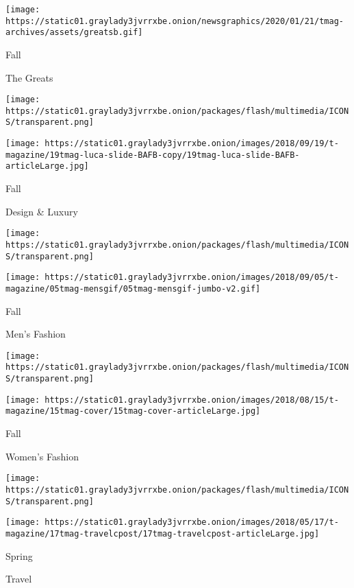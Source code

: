 \texttt{[image: https://static01.graylady3jvrrxbe.onion/newsgraphics/2020/01/21/tmag-archives/assets/greatsb.gif]}

Fall

The Greats

\href{https://www.nytimes3xbfgragh.onion/issue/t-magazine/2018/09/06/ts-sept-23-design-luxury-issue}{}

\texttt{[image: https://static01.graylady3jvrrxbe.onion/packages/flash/multimedia/ICONS/transparent.png]}

\texttt{[image: https://static01.graylady3jvrrxbe.onion/images/2018/09/19/t-magazine/19tmag-luca-slide-BAFB-copy/19tmag-luca-slide-BAFB-articleLarge.jpg]}

Fall

Design \& Luxury

\href{https://www.nytimes3xbfgragh.onion/issue/t-magazine/2018/08/31/ts-sept-9-mens-fashion-issue}{}

\texttt{[image: https://static01.graylady3jvrrxbe.onion/packages/flash/multimedia/ICONS/transparent.png]}

\texttt{[image: https://static01.graylady3jvrrxbe.onion/images/2018/09/05/t-magazine/05tmag-mensgif/05tmag-mensgif-jumbo-v2.gif]}

Fall

Men's Fashion

\href{https://www.nytimes3xbfgragh.onion/issue/t-magazine/2018/08/06/ts-aug-19-womens-fashion-issue}{}

\texttt{[image: https://static01.graylady3jvrrxbe.onion/packages/flash/multimedia/ICONS/transparent.png]}

\texttt{[image: https://static01.graylady3jvrrxbe.onion/images/2018/08/15/t-magazine/15tmag-cover/15tmag-cover-articleLarge.jpg]}

Fall

Women's Fashion

\href{https://www.nytimes3xbfgragh.onion/issue/t-magazine/2018/05/07/ts-may-20-travel-issue}{}

\texttt{[image: https://static01.graylady3jvrrxbe.onion/packages/flash/multimedia/ICONS/transparent.png]}

\texttt{[image: https://static01.graylady3jvrrxbe.onion/images/2018/05/17/t-magazine/17tmag-travelcpost/17tmag-travelcpost-articleLarge.jpg]}

Spring

Travel

\href{https://www.nytimes3xbfgragh.onion/issue/t-magazine/2018/04/06/ts-april-22-culture-issue}{}

